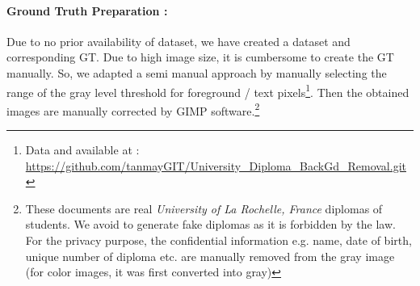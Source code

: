 \documentclass[runningheads]{llncs}
\begin{document}
\paragraph{Ground Truth Preparation : } 
Due to no prior availability of dataset, we have created a dataset and corresponding GT. Due to high image size, it is cumbersome to create the GT manually. So, we adapted a semi manual approach by manually selecting the range of the gray level threshold for foreground / text pixels\footnote{Data and available at : \url{https://github.com/tanmayGIT/University_Diploma_BackGd_Removal.git}\label{gitlink}}. Then the obtained images are manually corrected by GIMP software.\footnote{ These documents are real \textit{University of La Rochelle, France} diplomas of students. We avoid to generate fake diplomas as it is forbidden by the law. For the privacy purpose, the confidential information e.g. name, date of birth, unique number of diploma etc. are manually removed from the gray image (for color images, it was first converted into gray)} 
\end{document}
